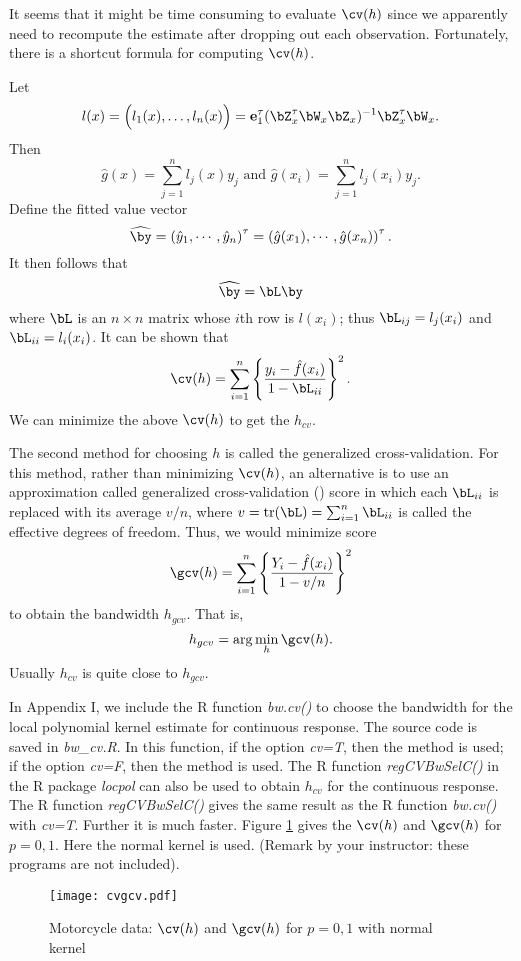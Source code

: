 It seems that it might be time consuming to evaluate $\cv(h)$
since we apparently need to recompute the estimate after dropping
out each observation. 
Fortunately, there is a shortcut formula for computing $\cv(h)$. 

Let 
$$
l(x)
=\Big( l_1(x),\ldots, l_{n}(x)
\Big)
={\bf e}_1^\tau(\bZ^\tau_x \bW_x \bZ_x)^{-1} \bZ_x^\tau \bW_x. 
$$
Then 
$$
\hat g(x)=\sum_{j=1}^n l_j(x) y_j
\mbox{ and }
\hat g(x_i)=\sum_{j=1}^n l_j(x_i) y_j. 
$$
Define the fitted value vector 
$$
\widehat\by
=\left(
\hat y_1,\cdots,\hat y_n
\right)^\tau
=\left(\hat g(x_1),\cdots,
\hat g(x_n)
\right)^\tau. 
$$
It then follows that 
$$
\widehat\by=\bL\by
$$
where $\bL$ is an $n\times n$ matrix whose $i$th row is $l(x_i)$; 
thus $\bL_{ij}=l_j(x_i)$ and $\bL_{ii}=l_i(x_i)$. 
It can be shown that 
$$
\cv(h)
=\sum_{i=1}^{n}\left\{\frac{y_i-\hat f(x_i)}{1-\bL_{ii}}\right\}^2. 
$$
We can minimize the above $\cv(h)$ to get the $h_{cv}$.

The second method for choosing $h$ is called the generalized cross-validation. 
For this method, rather than minimizing 
$\cv(h)$, an alternative is to use an approximation called 
generalized cross-validation (\gcv) score in which each $\bL_{ii}$ is replaced 
with its average $v/n$, where 
$v=\mbox{tr}(\bL)=\sum_{i=1}^n\bL_{ii}$ is called the effective degrees of freedom. 
Thus, we would minimize \gcv score
$$
\gcv(h)=\sum_{i=1}^n\left\{ \frac{Y_i-\hat f(x_i)}{1-v/n}\right\}^2
$$
to obtain the bandwidth $h_{gcv}$. 
That is, 
$$
h_{gcv}=\arg\min_h \gcv(h). 
$$
Usually $h_{cv}$ is quite close to $h_{gcv}$. 

In Appendix I, we include the R function {\it bw.cv()} to 
choose the bandwidth for the local polynomial kernel estimate for continuous response. 
The source code is saved in {\it bw\_cv.R}. 
In this function, if the option {\it cv=T}, then the \cv method is used; 
if the option {\it cv=F}, then the \gcv method is used. 
The R function {\it regCVBwSelC()} in the R package {\it locpol}
can also be used to obtain $h_{cv}$ for the continuous response. 
The R function {\it regCVBwSelC()} gives the same result as the R function 
{\it bw.cv()} with {\it cv=T}. 
Further it is much faster. 
Figure \ref{cvgcv} gives the $\cv(h)$ and $\gcv(h)$ for $p=0,1$. 
Here the normal kernel is used. 
(Remark by your instructor: these programs are not included).

\begin{figure}[p]
\caption{Motorcycle data: $\cv(h)$ and $\gcv(h)$ for $p=0,1$ with normal kernel}
\centerline{ \texttt{[image: cvgcv.pdf]}}
\label{cvgcv}
\end{figure}

